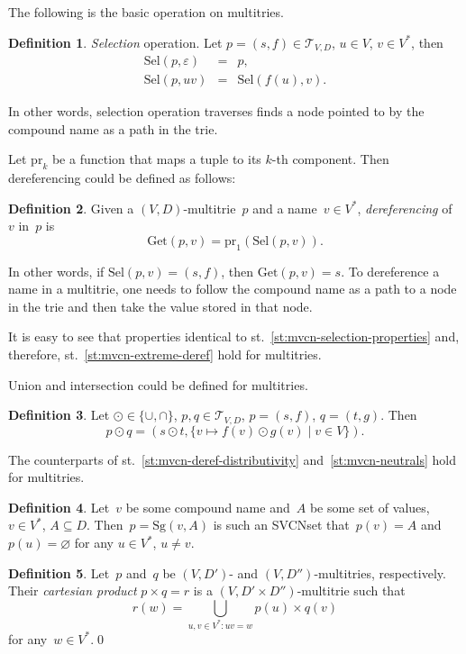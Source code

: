\documentclass{article}
\theoremstyle{definition}
\newtheorem{Df}{Definition}
\newcommand{\setcharmt}{T}
\newcommand{\setsymbol}[3]{\mathcal{#1}_{#2,#3}}
\newcommand{\setmt}[2]{\setsymbol{\setcharmt}{#1}{#2}}
\newcommand{\select}{\mathrm{Sel}}
\newcommand{\singleleaf}{\mathrm{Sg}}
\newcommand{\proj}[1]{\mathrm{pr}_{#1}}
\newcommand{\derefsymbol}{\mathrm{Get}}
\newcommand{\deref}[2]{\derefsymbol(#1, #2)}
\begin{document}
The following is the basic operation on multitries.
\begin{Df}\label{df:mt-select}
\emph{Selection} operation. Let $p=(s,f) \in \setmt{V}{D}$, $u\in V$,
$v\in V^\ast$, then
\begin{eqnarray*}
  \select(p, \varepsilon) & = & p , \\
  \select(p, u v) & = & \select(f(u), v) .
\end{eqnarray*}
\end{Df}

In other words, selection operation traverses finds a node pointed to by the
compound name as a path in the trie.

Let $\proj{k}$ be a function that maps a tuple to its $k$-th component.
Then dereferencing could be defined as follows:
\begin{Df}\label{df:mt-deref}
Given a $(V,D)$-multitrie~$p$ and a name~$v\in V^\ast$, \emph{dereferencing}
of~$v$ in~$p$ is
\[
  \deref{p}{v} = \proj{1}(\select(p, v)) .
\]
\end{Df}

In other words, if $\select(p,v) = (s,f)$, then $\deref{p}{v} = s$. To
dereference a name in a multitrie, one needs to follow the compound name
as a path to a node in the trie and then take the value stored in that node.

It is easy to see that properties identical to
st.~\ref{st:mvcn-selection-properties} and, therefore,
st.~\ref{st:mvcn-extreme-deref} hold for multitries.

Union and intersection could be defined for multitries.
\begin{Df}\label{df:mt-setop}
Let $\odot \in \{ \cup, \cap \}$, $p, q \in \setmt{V}{D}$,
$p = (s,f)$, $q = (t, g)$. Then
\[
  p \odot q = (s \odot t, \{ v \mapsto f(v) \odot g(v) \mid v \in V \}) .
\]
\end{Df}

The counterparts of st.~\ref{st:mvcn-deref-distributivity}
and~\ref{st:mvcn-neutrals} hold for multitries.


\begin{Df}
Let~$v$ be some compound name and~$A$ be some set of values, $v\in V^\ast$,
$A\subseteq D$.  Then~$p = \singleleaf(v,A)$ is such an SVCNset that~$p(v) =
A$ and~$p(u) = \varnothing$ for any $u\in V^\ast$, $u\neq v$.
\end{Df}

\begin{Df}\label{df:cartesian}
Let~$p$ and~$q$ be $(V,D')$- and $(V,D'')$-multitries, respectively. Their
\emph{cartesian product} $p\times q = r$ is a $(V,D'\times D'')$-multitrie
such that
\[
  r(w) = \bigcup_{u,v\in V^\ast: uv = w} p(u) \times q(v)
\]
for any~$w\in V^\ast$.\qed
\end{Df}
\end{document}
